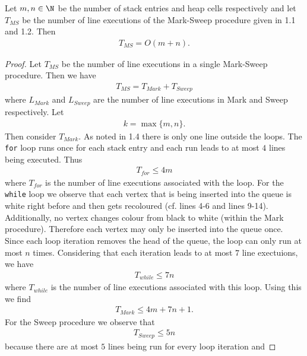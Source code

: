 \documentclass{article}
\begin{document}
\begin{claim*}
    Let $m,n\in\N$ be the number of stack entries and heap cells respectively and
    let $T_{MS}$ be the number of line executions of the Mark-Sweep procedure
    given in 1.1 and 1.2. Then
    \begin{align*}
        T_{MS} = O(m+n).
    \end{align*} 
\end{claim*}
\begin{proof}
    Let $T_{MS}$ be the number of line executions in a single Mark-Sweep procedure.
    Then we have
    \begin{align}
        \label{forlms}
        T_{MS} = T_{Mark} + T_{Sweep}
    \end{align}
    where $L_{Mark}$ and $L_{Sweep}$ are the number of line executions in Mark and
    Sweep respectively. Let
    \begin{align*}
        k = \max\{m,n\}.    
    \end{align*}
    Then consider $T_{Mark}$. As noted in 
    1.4 there is only one line outside the loops. The \texttt{for} loop runs once for each
    stack entry and each run leads to at most $4$ lines being executed. Thus
    \begin{align*}
        T_{for} \leq 4m
    \end{align*}
    where $T_{for}$ is the number of line executions associated with the loop. For
    the \texttt{while} loop we observe that each vertex that is being inserted into the
    queue is white right before and then gets recoloured (cf. lines 4-6 and lines 9-14).
    Additionally, no vertex changes colour from black to white (within the Mark procedure).
    Therefore each vertex may only be inserted into the queue once. Since each loop iteration 
    removes the head of the queue, the loop can only run at most $n$ times.
    Considering that each iteration leads to at most $7$ line exectuions, we have
    \begin{align*}
        T_{while} \leq 7n
    \end{align*}
    where $T_{while}$ is the number of line executions associated with this loop.
    Using this we find
    \begin{align*}
        T_{Mark} \leq 4m + 7n + 1.
    \end{align*}
     For the Sweep procedure we observe that
    \begin{align*}
        T_{Sweep} \leq 5n
    \end{align*}
    because there are at most $5$ lines being run for every loop iteration and

\end{proof}
\end{document}
